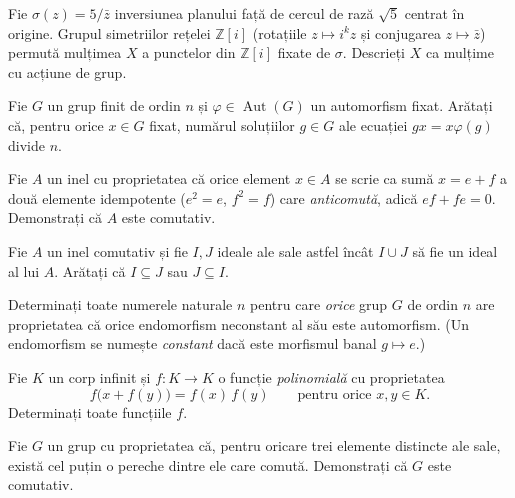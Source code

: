 \begin{problema}
Fie $\sigma(z)=5/\bar z$ inversiunea planului față de cercul de
rază $\sqrt5$ centrat în origine. Grupul simetriilor rețelei
$\mathbb{Z}[i]$ (rotațiile $z\mapsto i^{k}z$ și conjugarea
$z\mapsto\bar z$) permută mulțimea $X$ a punctelor din $\mathbb{Z}[i]$
fixate de $\sigma$. Descrieți $X$ ca mulțime cu acțiune de grup.
\end{problema}

\begin{problema}
Fie $G$ un grup finit de ordin $n$ și $\varphi\in\operatorname{Aut}(G)$
un automorfism fixat. Arătați că, pentru orice $x\in G$ fixat,
numărul soluțiilor $g\in G$ ale ecuației $gx=x\varphi(g)$ divide
$n$.
\end{problema}

\begin{problema}
Fie $A$ un inel cu proprietatea că orice element $x\in A$ se scrie ca
sumă $x=e+f$ a două elemente idempotente ($e^{2}=e$, $f^{2}=f$) care
\emph{anticomută}, adică $ef+fe=0$. Demonstrați că $A$ este
comutativ.
\end{problema}

\begin{problema}
Fie $A$ un inel comutativ și fie $I,J$ ideale ale sale astfel încât $I \cup J$ să fie un ideal al lui $A$. Arătați că $I \subseteq J$ sau $J \subseteq I$.
\end{problema}

\begin{problema}
Determinați toate numerele naturale $n$ pentru care \emph{orice} grup
$G$ de ordin $n$ are proprietatea că orice endomorfism neconstant al
său este automorfism. (Un endomorfism se numește \emph{constant}
dacă este morfismul banal $g \mapsto e$.)
\end{problema}

\begin{problema}
Fie $K$ un corp infinit și $f : K \to K$ o funcție
\emph{polinomială} cu proprietatea
\[
  f\bigl(x+f(y)\bigr) = f(x)\,f(y) \qquad \text{pentru orice } x,y \in K .
\]
Determinați toate funcțiile $f$.
\end{problema}

\begin{problema}
Fie $G$ un grup cu proprietatea că, pentru oricare trei elemente
distincte ale sale, există cel puțin o pereche dintre ele care
comută. Demonstrați că $G$ este comutativ.
\end{problema}

\setcounter{cat}{2}\setcounter{problemaX}{0}


